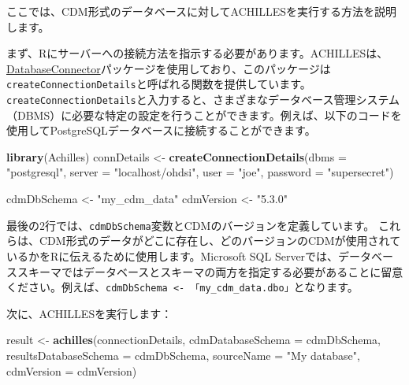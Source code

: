 \documentclass[
  11pt]{book}
\newenvironment{Shaded}{\begin{snugshade}}{\end{snugshade}}
\newcommand{\AttributeTok}[1]{\textcolor[rgb]{0.13,0.29,0.53}{#1}}
\newcommand{\FunctionTok}[1]{\textcolor[rgb]{0.13,0.29,0.53}{\textbf{#1}}}
\newcommand{\NormalTok}[1]{#1}
\newcommand{\OtherTok}[1]{\textcolor[rgb]{0.56,0.35,0.01}{#1}}
\newcommand{\StringTok}[1]{\textcolor[rgb]{0.31,0.60,0.02}{#1}}
\theoremstyle{definition}
\theoremstyle{definition}
\theoremstyle{definition}
\theoremstyle{definition}
\theoremstyle{remark}
\begin{document}
ここでは、CDM形式のデータベースに対してACHILLESを実行する方法を説明します。

まず、Rにサーバーへの接続方法を指示する必要があります。ACHILLESは、\href{https://ohdsi.github.io/DatabaseConnector/}{DatabaseConnector}パッケージを使用しており、このパッケージは\texttt{createConnectionDetails}と呼ばれる関数を提供しています。\texttt{createConnectionDetails}と入力すると、さまざまなデータベース管理システム（DBMS）に必要な特定の設定を行うことができます。例えば、以下のコードを使用してPostgreSQLデータベースに接続することができます。

\begin{Shaded}
\begin{Highlighting}[]
\FunctionTok{library}\NormalTok{(Achilles)}
\NormalTok{connDetails }\OtherTok{\textless{}{-}} \FunctionTok{createConnectionDetails}\NormalTok{(}\AttributeTok{dbms =} \StringTok{"postgresql"}\NormalTok{,}
                                       \AttributeTok{server =} \StringTok{"localhost/ohdsi"}\NormalTok{,}
                                       \AttributeTok{user =} \StringTok{"joe"}\NormalTok{,}
                                       \AttributeTok{password =} \StringTok{"supersecret"}\NormalTok{)}

\NormalTok{cdmDbSchema }\OtherTok{\textless{}{-}} \StringTok{"my\_cdm\_data"}
\NormalTok{cdmVersion }\OtherTok{\textless{}{-}} \StringTok{"5.3.0"}
\end{Highlighting}
\end{Shaded}

最後の2行では、\texttt{cdmDbSchema}変数とCDMのバージョンを定義しています。 これらは、CDM形式のデータがどこに存在し、どのバージョンのCDMが使用されているかをRに伝えるために使用します。Microsoft SQL Serverでは、データベーススキーマではデータベースとスキーマの両方を指定する必要があることに留意ください。例えば、\texttt{cdmDbSchema\ \textless{}-\ 「my\_cdm\_data.dbo」}となります。

次に、ACHILLESを実行します：

\begin{Shaded}
\begin{Highlighting}[]
\NormalTok{result }\OtherTok{\textless{}{-}} \FunctionTok{achilles}\NormalTok{(connectionDetails,}
                   \AttributeTok{cdmDatabaseSchema =}\NormalTok{ cdmDbSchema,}
                   \AttributeTok{resultsDatabaseSchema =}\NormalTok{ cdmDbSchema,}
                   \AttributeTok{sourceName =} \StringTok{"My database"}\NormalTok{,}
                   \AttributeTok{cdmVersion =}\NormalTok{ cdmVersion)}
\end{Highlighting}
\end{Shaded}
\end{document}
